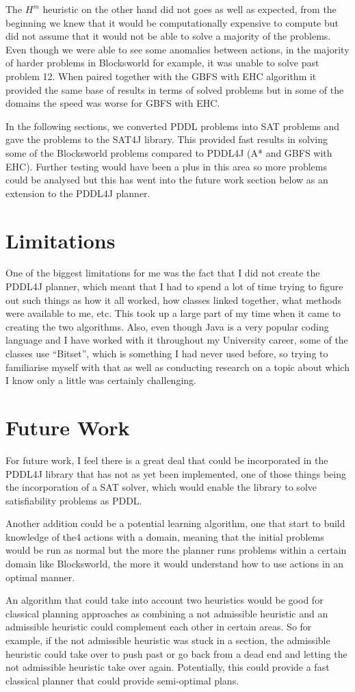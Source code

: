 The $H^m$ heuristic on the other hand did not goes as well as expected, from the beginning we knew that it would be computationally expensive to compute but did not assume that it would not be able to solve a majority of the problems. Even though we were able to see some anomalies between actions, in the majority of harder problems in Blocksworld for example, it was unable to solve past problem 12. When paired together with the GBFS with EHC algorithm it provided the same base of results in terms of solved problems but in some of the domains the speed was worse for GBFS with EHC.  

In the following sections, we converted PDDL problems into SAT problems and gave the problems to the SAT4J library. This provided fast results in solving some of the Blocksworld problems compared to PDDL4J (A* and GBFS with EHC). Further testing would have been a plus in this area so more problems could be analysed but this has went into the future work section below as an extension to the PDDL4J planner. 
\section{Limitations}
One of the biggest limitations for me was the fact that I did not create the PDDL4J planner, which meant that I had to spend a lot of time trying to figure out such things as how it all worked, how classes linked together, what methods were available to me, etc.  This took up a large part of my time when it came to creating the two algorithms.  Also, even though Java is a very popular coding language and I have worked with it throughout my University career, some of the classes use “Bitset”, which is something I had never used before, so trying to familiarise myself with that as well as conducting research on a topic about which I know only a little was certainly challenging.
\section{Future Work} 
For future work, I feel there is a great deal that could be incorporated in the PDDL4J library that has not as yet been implemented, one of those things being the incorporation of a SAT solver, which would enable the library to solve satisfiability problems as PDDL.

Another addition could be a potential learning algorithm, one that start to build knowledge of the4 actions with a domain, meaning that the initial problems would be run as normal but the more the planner runs problems within a certain domain like Blocksworld, the more it would understand how to use actions in an optimal manner.

An algorithm that could take into account two heuristics would be good for classical planning approaches as combining a not admissible heuristic and an admissible heuristic could complement each other in certain areas. So for example, if the not admissible heuristic was stuck in a section, the admissible heuristic could take over to push past or go back from a dead end and letting the not admissible heuristic take over again. Potentially, this could provide a fast classical planner that could provide semi-optimal plans. 